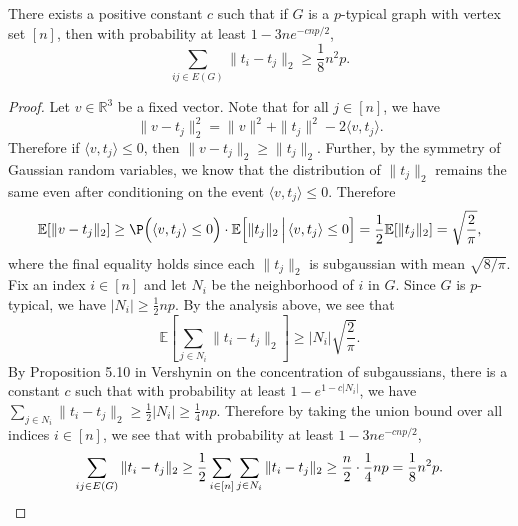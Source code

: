 \begin{lemma} \label{lem:gaussian_length}
There exists a positive constant $c$ such that if $G$ is a $p$-typical graph with vertex set $[n]$, then with probability at least 
$1 - 3ne^{-cnp/2}$, 
\[
	\sum_{ij \in E(G)} \|t_i - t_j\|_2 \ge \frac{1}{8} n^2p.
\]
\end{lemma}
\begin{proof}
%
%
Let $v \in \mathbb{R}^3$ be a fixed vector. 
Note that for all $j \in [n]$, we have
\[
	\|v - t_j\|_2^2
	= \|v\|^2 + \|t_j\|^2 - 2 \langle v, t_j \rangle.
\]
Therefore if $\langle v, t_j \rangle \le 0$, then $\|v - t_j\|_2 \ge \|t_j\|_2$. 
Further, by the symmetry of Gaussian random variables, we know that
the distribution of $\|t_j\|_2$ remains the same even after conditioning on the event
$\langle v, t_j \rangle \le 0$. Therefore
\[
	\mathbb{E}[\|v - t_j\|_2]
	\ge \P\Big(\langle v,t_j\rangle \le 0\Big) \cdot \mathbb{E}\Big[\|t_j\|_2 \,\Big|\, \langle v, t_j \rangle \le 0\Big]
	= \frac{1}{2} \mathbb{E}[\|t_j\|_2]
	= \sqrt{\frac{2}{\pi}},
\]
where the final equality holds since each $\|t_j\|_2$ is subgaussian with mean $\sqrt{8/\pi}$.  
Fix an index $i \in [n]$ and let $N_i$ be the neighborhood of $i$ in $G$. 
Since $G$ is $p$-typical, we have $|N_i| \ge \frac{1}{2}np$. 
By the analysis above, we see that
\[
	\mathbb{E}\left[ \sum_{j \in N_i} \|t_i - t_j\|_2 \right]
	\ge |N_i|\sqrt{\frac{2}{\pi}}.
\]
By Proposition 5.10 in Vershynin \cite{Vershynin} on the concentration of subgaussians, there is a constant $c$ such that
with probability at least $1 - e^{1-c|N_i|}$, we have
$\sum_{j \in N_i} \|t_i - t_j\|_2 \ge \frac{1}{2}|N_i| \ge \frac{1}{4}np$.
Therefore by taking the union bound over all indices $i \in [n]$, 
we see that with probability at least $1 - 3ne^{-cnp/2}$, 
\[
	\sum_{ij \in E(G)} \|t_i - t_j\|_2
	\ge \frac{1}{2} \sum_{i \in [n]}\sum_{j \in N_i} \|t_i - t_j\|_2
	\ge \frac{n}{2} \cdot \frac{1}{4}np = \frac{1}{8}n^2p. \qedhere
\]
\end{proof}

